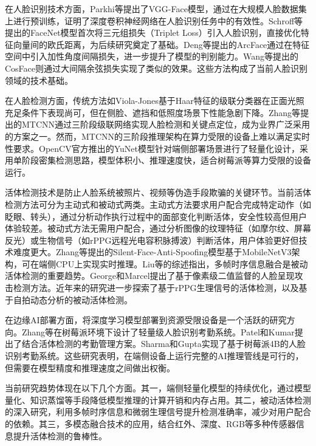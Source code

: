 在人脸识别技术方面，Parkhi等\cite{parkhi2015deep}提出了VGG-Face模型，通过在大规模人脸数据集上进行预训练，证明了深度卷积神经网络在人脸识别任务中的有效性。Schroff等\cite{schroff2015facenet}提出的FaceNet模型首次将三元组损失（Triplet Loss）引入人脸识别，直接优化特征向量间的欧氏距离，为后续研究奠定了基础。Deng等\cite{deng2019arcface}提出的ArcFace通过在特征空间中引入加性角度间隔损失，进一步提升了模型的判别能力。Wang等\cite{wang2018cosface}提出的CosFace则通过大间隔余弦损失实现了类似的效果。这些方法构成了当前人脸识别领域的技术基础。

在人脸检测方面，传统方法如Viola-Jones基于Haar特征的级联分类器在正面光照充足条件下表现尚可，但在侧脸、遮挡和低照度场景下性能急剧下降。Zhang等\cite{zhang2016mtcnn}提出的MTCNN通过三阶段级联网络实现人脸检测和关键点定位，成为业界广泛采用的方案之一。然而，MTCNN的三阶段推理架构在算力受限的设备上难以满足实时性要求。OpenCV官方推出的YuNet模型\cite{yunet}针对端侧部署场景进行了轻量化设计，采用单阶段密集检测思路，模型体积小、推理速度快，适合树莓派等算力受限的设备运行。

活体检测技术是防止人脸系统被照片、视频等伪造手段欺骗的关键环节。当前活体检测方法可分为主动式和被动式两类。主动式方法要求用户配合完成特定动作（如眨眼、转头），通过分析动作执行过程中的面部变化判断活体，安全性较高但用户体验较差。被动式方法无需用户配合，通过分析图像的纹理特征（如摩尔纹、屏幕反光）或生物信号（如rPPG远程光电容积脉搏波）判断活体，用户体验更好但技术难度更大。Zhang等\cite{silentface}提出的Silent-Face-Anti-Spoofing模型基于MobileNetV3架构，可在端侧CPU上实现实时推理。Liu等\cite{li2025survey}的综述指出，多帧时序信息融合是被动活体检测的重要趋势。George和Marcel\cite{george2019pad}提出了基于像素级二值监督的人脸呈现攻击检测方法。近年来的研究进一步探索了基于rPPG生理信号的活体检测\cite{pmc2022rppg,acm2014rppg}，以及基于自拍动态分析的被动活体检测\cite{arxiv2025selfie}。

在边缘AI部署方面，将深度学习模型部署到资源受限设备是一个活跃的研究方向。Zhang等\cite{acm2025lightweight}在树莓派环境下设计了轻量级人脸识别考勤系统。Patel和Kumar\cite{itm2025liveness}提出了结合活体检测的考勤管理方案。Sharma和Gupta\cite{ieee2024raspberry}实现了基于树莓派4B的人脸识别考勤系统。这些研究表明，在端侧设备上运行完整的AI推理管线是可行的，但需要在模型精度和推理速度之间做出权衡。

当前研究趋势体现在以下几个方面。其一，端侧轻量化模型的持续优化，通过模型量化、知识蒸馏等手段降低模型推理的计算开销和内存占用。其二，被动活体检测的深入研究，利用多帧时序信息和微弱生理信号提升检测准确率，减少对用户配合的依赖。其三，多模态融合技术的应用，结合红外、深度、RGB等多种传感器信息提升活体检测的鲁棒性。

